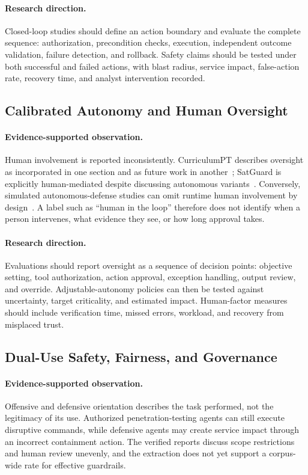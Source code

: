 \paragraph{Research direction.}
Closed-loop studies should define an action boundary and evaluate the complete sequence: authorization, precondition checks, execution, independent outcome validation, failure detection, and rollback. Safety claims should be tested under both successful and failed actions, with blast radius, service impact, false-action rate, recovery time, and analyst intervention recorded.

\subsection{Calibrated Autonomy and Human Oversight}

\paragraph{Evidence-supported observation.}
Human involvement is reported inconsistently. CurriculumPT describes oversight as incorporated in one section and as future work in another~\cite{R0322_Wu_2025}; SatGuard is explicitly human-mediated despite discussing autonomous variants~\cite{R0384_Xiao_2025}. Conversely, simulated autonomous-defense studies can omit runtime human involvement by design~\cite{R0484_Bogdanov_2026}. A label such as ``human in the loop'' therefore does not identify when a person intervenes, what evidence they see, or how long approval takes.

\paragraph{Research direction.}
Evaluations should report oversight as a sequence of decision points: objective setting, tool authorization, action approval, exception handling, output review, and override. Adjustable-autonomy policies can then be tested against uncertainty, target criticality, and estimated impact. Human-factor measures should include verification time, missed errors, workload, and recovery from misplaced trust.

\subsection{Dual-Use Safety, Fairness, and Governance}

\paragraph{Evidence-supported observation.}
Offensive and defensive orientation describes the task performed, not the legitimacy of its use. Authorized penetration-testing agents can still execute disruptive commands, while defensive agents may create service impact through an incorrect containment action. The verified reports discuss scope restrictions and human review unevenly, and the extraction does not yet support a corpus-wide rate for effective guardrails.

